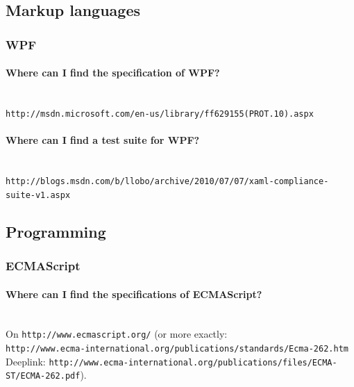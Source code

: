 \documentclass[10pt]{scrbook}
\begin{document}
\subsection{Markup languages}

\subsubsection{WPF}

\paragraph{Where can I find the specification of WPF?} ~ \\
\verb|http://msdn.microsoft.com/en-us/library/ff629155(PROT.10).aspx|

\paragraph{Where can I find a test suite for WPF?} ~ \\
\verb|http://blogs.msdn.com/b/llobo/archive/2010/07/07/xaml-compliance-suite-v1.aspx|

\subsection{Programming}

\subsubsection{ECMAScript}

\paragraph{Where can I find the specifications of ECMAScript?} ~ \\
On \verb|http://www.ecmascript.org/| (or more exactly: \\
\verb|http://www.ecma-international.org/publications/standards/Ecma-262.htm| \\
Deeplink: \verb|http://www.ecma-international.org/publications/files/ECMA-ST/ECMA-262.pdf|).
\end{document}
